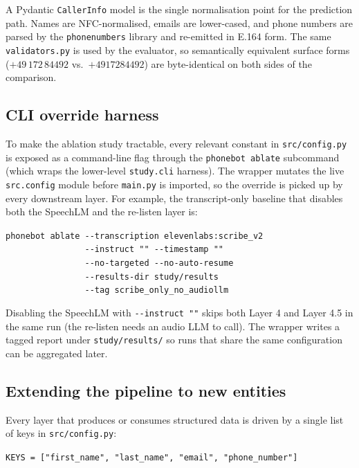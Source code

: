 \documentclass[11pt,a4paper]{article}
\begin{document}
A Pydantic \verb|CallerInfo| model is the single normalisation point
for the prediction path. Names are NFC-normalised, emails are
lower-cased, and phone numbers are parsed by the \verb|phonenumbers|
library and re-emitted in E.164 form. The same \verb|validators.py|
is used by the evaluator, so semantically equivalent surface forms
($+49\,172\,84492$ vs.\ $+4917284492$) are byte-identical on both
sides of the comparison.

\subsection{CLI override harness}\label{sec:m_cli}

To make the ablation study tractable, every relevant constant in
\verb|src/config.py| is exposed as a command-line flag through the
\verb|phonebot ablate| subcommand (which wraps the lower-level
\verb|study.cli| harness). The wrapper mutates the live
\verb|src.config| module before \verb|main.py| is imported, so the
override is picked up by every downstream layer. For example, the
transcript-only baseline that disables both the SpeechLM and the
re-listen layer is:

\begin{center}\small
\verb|phonebot ablate --transcription elevenlabs:scribe_v2|\\
\verb|                --instruct "" --timestamp ""|\\
\verb|                --no-targeted --no-auto-resume|\\
\verb|                --results-dir study/results|\\
\verb|                --tag scribe_only_no_audiollm|
\end{center}

Disabling the SpeechLM with \verb|--instruct ""| skips both Layer 4
and Layer 4.5 in the same run (the re-listen needs an audio LLM to
call). The wrapper writes a tagged report under
\verb|study/results/| so runs that share the same configuration can
be aggregated later.

\subsection{Extending the pipeline to new entities}\label{sec:m_extend}

Every layer that produces or consumes structured data is driven by a
single list of keys in \verb|src/config.py|:

\begin{center}\small
\verb|KEYS = ["first_name", "last_name", "email", "phone_number"]|
\end{center}
\end{document}
